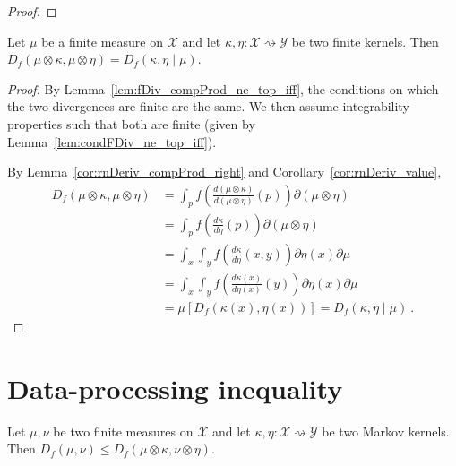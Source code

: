 \begin{proof} \leanok
{}
\end{proof}

\begin{lemma}
  \label{lem:fDiv_compProd_left}
  \leanok
  Let $\mu$ be a finite measure on $\mathcal X$ and let $\kappa, \eta : \mathcal X \rightsquigarrow \mathcal Y$ be two finite kernels.
  Then $D_f(\mu \otimes \kappa, \mu \otimes \eta) = D_f(\kappa, \eta \mid \mu)$.
\end{lemma}

\begin{proof} \leanok
{}
By Lemma~\ref{lem:fDiv_compProd_ne_top_iff}, the conditions on which the two divergences are finite are the same. We then assume integrability properties such that both are finite (given by Lemma~\ref{lem:condFDiv_ne_top_iff}).

By Lemma~\ref{cor:rnDeriv_compProd_right} and Corollary~\ref{cor:rnDeriv_value},
\begin{align*}
D_f(\mu \otimes \kappa, \mu \otimes \eta)
&= \int_{p} f\left(\frac{d (\mu \otimes \kappa)}{d (\mu \otimes \eta)}(p)\right) \partial(\mu \otimes \eta)
\\
&= \int_{p} f\left(\frac{d \kappa}{d \eta}(p)\right) \partial(\mu \otimes \eta)
\\
&= \int_x \int_y f\left(\frac{d \kappa}{d \eta}(x, y)\right) \partial \eta(x) \partial \mu
\\
&= \int_x \int_y f\left(\frac{d \kappa(x)}{d \eta(x)}(y)\right) \partial \eta(x) \partial \mu
\\
&= \mu\left[D_f(\kappa(x), \eta(x))\right]
= D_f(\kappa, \eta \mid \mu)
\: .
\end{align*}
\end{proof}

\section{Data-processing inequality}

\begin{theorem}
  \label{thm:fDiv_le_compProd}
  Let $\mu, \nu$ be two finite measures on $\mathcal X$ and let $\kappa, \eta : \mathcal X \rightsquigarrow \mathcal Y$ be two Markov kernels.
  Then $D_f(\mu, \nu) \le D_f(\mu \otimes \kappa, \nu \otimes \eta)$.
\end{theorem}

